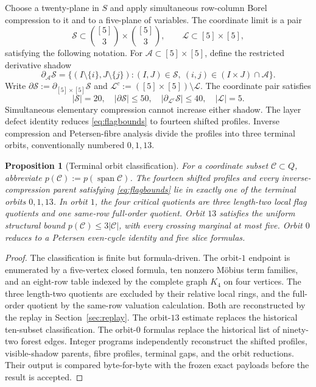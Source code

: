 \documentclass[11pt,reqno]{amsart}
\newtheorem{proposition}[theorem]{Proposition}
\theoremstyle{definition}
\newcommand{\Span}{\operatorname{span}}
\begin{document}
Choose a twenty-plane in \(S\) and apply simultaneous row-column Borel
compression to it and to a five-plane of variables. The coordinate limit is
a pair
\[
 \mathcal S\subset\binom{[5]}3\times\binom{[5]}3,\qquad
 \mathcal L\subset[5]\times[5],
\]
satisfying the following notation. For
\(\mathcal A\subset[5]\times[5]\), define the restricted derivative shadow
\[
 \partial_{\mathcal A}\mathcal S=
 \{(I\setminus\{i\},J\setminus\{j\}):
 (I,J)\in\mathcal S,\ (i,j)\in(I\times J)\cap\mathcal A\}.
\]
Write \(\partial\mathcal S:=\partial_{[5]\times[5]}\mathcal S\) and
\(\mathcal L^c:=([5]\times[5])\setminus\mathcal L\). The coordinate pair
satisfies
\begin{equation}\label{eq:flagbounds}
 |\mathcal S|=20,\quad |\partial\mathcal S|\le50,\quad
 |\partial_{\mathcal L^c}\mathcal S|\le40,\quad |\mathcal L|=5.
\end{equation}
Simultaneous elementary compression cannot increase either shadow. The layer
defect identity reduces \eqref{eq:flagbounds} to fourteen shifted profiles.
Inverse compression and Petersen-fibre analysis divide the profiles into three
terminal orbits, conventionally numbered \(0,1,13\).

\begin{proposition}[Terminal orbit classification]\label{prop:terminal}
For a coordinate subset \(\mathcal C\subset Q\), abbreviate
\(p(\mathcal C):=p(\Span\mathcal C)\). The fourteen shifted profiles and every inverse-compression parent satisfying
\eqref{eq:flagbounds} lie in exactly one of the terminal orbits \(0,1,13\).
In orbit \(1\), the four critical quotients are three length-two local
flag quotients and one same-row full-order quotient. Orbit \(13\)
satisfies the uniform structural bound \(p(\mathcal C)\le3|\mathcal C|\), with every crossing
marginal at most five. Orbit \(0\) reduces to a Petersen even-cycle identity
and five slice formulas.
\end{proposition}

\begin{proof}
The classification is finite but formula-driven. The orbit-\(1\) endpoint is
enumerated by a five-vertex closed formula, ten nonzero M\"obius term families,
and an eight-row table indexed by the complete graph \(K_4\) on four vertices.
The three length-two quotients are excluded by their relative local rings, and
the full-order quotient by the same-row valuation calculation. Both are
reconstructed by the replay in Section~\ref{sec:replay}. The orbit-\(13\)
estimate replaces the historical ten-subset
classification. The orbit-\(0\) formulas replace the historical list of
ninety-two forest edges. Integer programs independently reconstruct the
shifted profiles, visible-shadow parents, fibre profiles, terminal gaps, and
the orbit reductions. Their output is compared byte-for-byte with the frozen
exact payloads before the result is accepted.
\end{proof}
\end{document}
